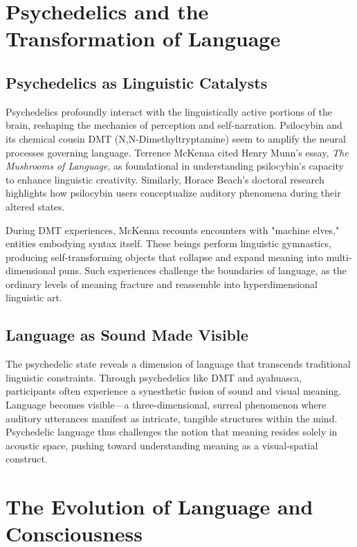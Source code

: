 \documentclass[12pt]{article}
\begin{document}
\section*{Psychedelics and the Transformation of Language}

\subsection*{Psychedelics as Linguistic Catalysts}

Psychedelics profoundly interact with the linguistically active portions of the brain, reshaping the mechanics of perception and self-narration. Psilocybin and its chemical cousin DMT (N,N-Dimethyltryptamine) seem to amplify the neural processes governing language. Terrence McKenna cited Henry Munn's essay, \textit{The Mushrooms of Language}, as foundational in understanding psilocybin's capacity to enhance linguistic creativity. Similarly, Horace Beach's doctoral research highlights how psilocybin users conceptualize auditory phenomena during their altered states.

During DMT experiences, McKenna recounts encounters with "machine elves," entities embodying syntax itself. These beings perform linguistic gymnastics, producing self-transforming objects that collapse and expand meaning into multi-dimensional puns. Such experiences challenge the boundaries of language, as the ordinary levels of meaning fracture and reassemble into hyperdimensional linguistic art.

\subsection*{Language as Sound Made Visible}

The psychedelic state reveals a dimension of language that transcends traditional linguistic constraints. Through psychedelics like DMT and ayahuasca, participants often experience a synesthetic fusion of sound and visual meaning. Language becomes visible—a three-dimensional, surreal phenomenon where auditory utterances manifest as intricate, tangible structures within the mind. Psychedelic language thus challenges the notion that meaning resides solely in acoustic space, pushing toward understanding meaning as a visual-spatial construct.

\section*{The Evolution of Language and Consciousness}
\end{document}
